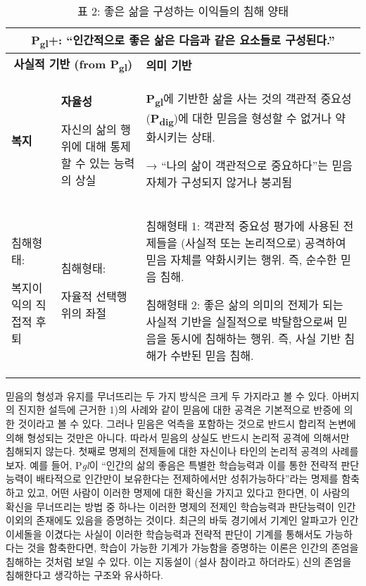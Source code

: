 \begin{table}[H]
\centering
\caption*{표 2: 좋은 삶을 구성하는 이익들의 침해 양태}

\begin{tabular}{|p{4.2cm}|p{4.2cm}|p{6.6cm}|}
\hline
\multicolumn{3}{|c|}{\textbf{P\textsubscript{gl}+}: ``인간적으로 좋은 삶은 다음과 같은 요소들로 구성된다.''} \\
\hline
\multicolumn{2}{|c|}{\textbf{사실적 기반 (from P\textsubscript{gl})}} & \textbf{의미 기반} \\
\hline
\textbf{복지} & \textbf{자율성} 

자신의 삶의 행위에 대해 통제할 수 있는 능력의 상실
& 
\textbf{P\textsubscript{gl}}에 기반한 삶을 사는 것의 객관적 중요성 
(\textbf{P\textsubscript{dig}})에 대한 믿음을 형성할 수 없거나 약화시키는 상태.

→ ``나의 삶이 객관적으로 중요하다''는 믿음 자체가 구성되지 않거나 붕괴됨 \\
\hline
침해형태: 

\vspace{0.5em}

복지이익의 직접적 후퇴
& 침해형태: 

\vspace{0.5em}

자율적 선택행위의 좌절
& 침해형태 1: 객관적 중요성 평가에 사용된 전제들을 (사실적 또는 논리적으로) 공격하여 믿음 자체를 약화시키는 행위. 즉, 순수한 믿음 침해.

\vspace{0.5em}

침해형태 2: 좋은 삶의 의미의 전제가 되는 사실적 기반을 실질적으로 박탈함으로써 믿음을 동시에 침해하는 행위. 즉, 사실 기반 침해가 수반된 믿음 침해. \\
\hline
\end{tabular}
\end{table}

믿음의 형성과 유지를 무너뜨리는 두 가지 방식은 크게 두 가지라고 볼 수 있다. 아버지의 진지한 설득에 근거한 1)의 사례와 같이 믿음에 대한 공격은 기본적으로 반증에 의한 것이라고 볼 수 있다. 그러나 믿음은 억측을 포함하는 것으로 반드시 합리적 논변에 의해 형성되는 것만은 아니다. 따라서 믿음의 상실도 반드시 논리적 공격에 의해서만 침해되지 않는다. 첫째로 명제의 전제들에 대한 자신이나 타인의 논리적 공격의 사례를 보자. 예를 들어, P\emph{gl}이 ``인간의 삶의 좋음은 특별한 학습능력과 이를 통한 전략적 판단능력이 배타적으로 인간만이 보유한다는 전제하에서만 성취가능하다''라는 명제를 함축하고 있고, 어떤 사람이 이러한 명제에 대한 확신을 가지고 있다고 한다면, 이 사람의 확신을 무너뜨리는 방법 중 하나는 이러한 명제의 전제인 학습능력과 판단능력이 인간 이외의 존재에도 있음을 증명하는 것이다. 최근의 바둑 경기에서 기계인 알파고가 인간 이세돌을 이겼다는 사실이 이러한 학습능력과 전략적 판단이 기계를 통해서도 가능하다는 것을 함축한다면, 학습이 가능한 기계가 가능함을 증명하는 이론은 인간의 존엄을 침해하는 것처럼 보일 수 있다. 이는 지동설이 (설사 참이라고 하더라도) 신의 존엄을 침해한다고 생각하는 구조와 유사하다.

